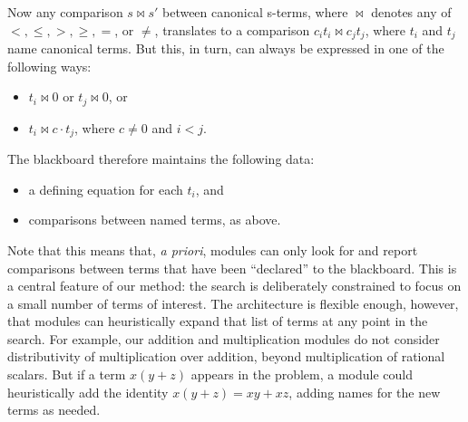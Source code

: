 \documentclass[runningheds]{llncs}
\begin{document}
Now any comparison $s \bowtie s'$ between canonical s-terms, where $\bowtie$ denotes any of $<, \le, >, \ge, =$, or $\neq$, translates to a comparison $c_i t_i \bowtie c_j t_j$, where $t_i$ and $t_j$ name canonical terms. But this, in turn, can always be expressed in one of the following ways:
\begin{itemize}
 \item $t_i \bowtie 0$ or $t_j \bowtie 0$, or
 \item $t_i \bowtie c \cdot t_j$, where $c \neq 0$ and $i < j$. 
\end{itemize}
The blackboard therefore maintains the following data:
\begin{itemize}
 \item a defining equation for each $t_i$, and
 \item comparisons between named terms, as above.
\end{itemize}
Note that this means that, \emph{a priori}, modules can only look for and report comparisons between terms that have been ``declared'' to the blackboard. This is a central feature of our method: the search is deliberately constrained to focus on a small number of terms of interest. The architecture is flexible enough, however, that modules can heuristically expand that list of terms at any point in the search. For example, our addition and multiplication modules do not consider distributivity of multiplication over addition, beyond multiplication of rational scalars. But if a term $x (y + z)$ appears in the problem, a module could heuristically add the identity $x (y + z) = x y + x z$, adding names for the new terms as needed.
\end{document}
